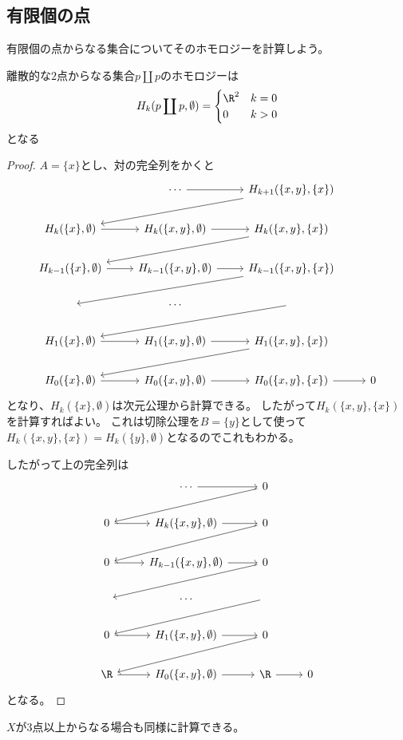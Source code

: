 \documentclass{jsarticle}
\begin{document}
\subsection{有限個の点}
有限個の点からなる集合についてそのホモロジーを計算しよう。

\begin{prop}
離散的な$2$点からなる集合$p\coprod p$のホモロジーは
\[
H_k(p\coprod p,\emptyset)=\begin{cases}\R^2&k=0\\0&k>0\end{cases}
\]
となる
\end{prop}
\begin{proof}
$A=\{x\}$とし、対の完全列をかくと
\[
\begin{tikzcd}
~ &\cdots \ar[r] &H_{k+1}(\{x,y\},\{x\}) \ar[dll]\\
H_k(\{x\},\emptyset) \ar[r] &H_k(\{x,y\},\emptyset) \ar[r] &H_k(\{x,y\},\{x\}) \ar[dll]\\
H_{k-1}(\{x\},\emptyset) \ar[r] &H_{k-1}(\{x,y\},\emptyset) \ar[r] &H_{k-1}(\{x,y\},\{x\}) \ar[dll]\\
~&\cdots&\ar[dll]\\
H_{1}(\{x\},\emptyset) \ar[r] &H_{1}(\{x,y\},\emptyset) \ar[r] &H_{1}(\{x,y\},\{x\}) \ar[dll]\\
H_{0}(\{x\},\emptyset) \ar[r] &H_{0}(\{x,y\},\emptyset) \ar[r] &H_{0}(\{x,y\},\{x\}) \ar[r]&0
\end{tikzcd}
\]
となり、$H_k(\{x\},\emptyset)$は次元公理から計算できる。
したがって$H_k(\{x,y\},\{x\})$を計算すればよい。
これは切除公理を$B=\{y\}$として使って$H_k(\{x,y\},\{x\})=H_k(\{y\},\emptyset)$となるのでこれもわかる。

したがって上の完全列は
\[
\begin{tikzcd}
~ &\cdots \ar[r] &0 \ar[dll]\\
0 \ar[r] &H_k(\{x,y\},\emptyset) \ar[r] & 0 \ar[dll]\\
0 \ar[r] &H_{k-1}(\{x,y\},\emptyset) \ar[r] & 0 \ar[dll]\\
~&\cdots&\ar[dll]\\
0 \ar[r] &H_{1}(\{x,y\},\emptyset) \ar[r] & 0 \ar[dll]\\
\R \ar[r] &H_{0}(\{x,y\},\emptyset) \ar[r] & \R \ar[r]&0
\end{tikzcd}
\]
となる。
\end{proof}
$X$が$3$点以上からなる場合も同様に計算できる。
\end{document}

